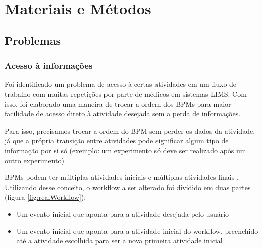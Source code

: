 \section{Materiais e Métodos} \label{methods}


\subsection{Problemas}

\subsubsection{Acesso à informações}

Foi identificado um problema de acesso à certas atividades em um fluxo de trabalho com muitas repetições por parte de médicos em sistemas LIMS. Com isso, foi elaborado uma maneira de trocar a ordem dos BPMs para maior facilidade de acesso direto à atividade desejada sem a perda de informações.

Para isso, precisamos trocar a ordem do BPM sem perder os dados da atividade, já que a própria transição entre atividades pode significar algum tipo de informação por si só (exemplo: um experimento só deve ser realizado após um outro experimento)

BPMs podem ter múltiplas atividades iniciais e múltiplas atividades finais \cite{Dijkman2008}. Utilizando desse conceito, o workflow a ser alterado foi dividido em duas partes (figura \ref{fig:realWorkflow}): 

\begin{itemize}
    \item Um evento inicial que aponta para a atividade desejada pelo usuário
    \item Um evento inicial que aponta para a atividade inicial do workflow, preenchido até a atividade escolhida para ser a nova primeira atividade inicial
\end{itemize}

